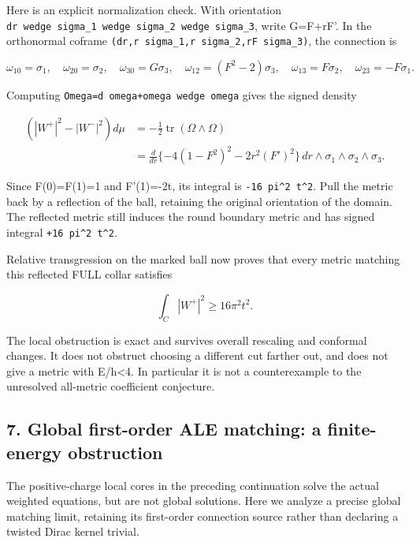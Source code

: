 \documentclass[
  10pt,
]{article}
\begin{document}
Here is an explicit normalization check. With orientation
\texttt{dr\ wedge\ sigma\_1\ wedge\ sigma\_2\ wedge\ sigma\_3}, write
G=F+rF'. In the orthonormal coframe
\texttt{(dr,r\ sigma\_1,r\ sigma\_2,rF\ sigma\_3)}, the connection is

\[
 \omega_{10}=\sigma_1,\quad\omega_{20}=\sigma_2,
 \quad\omega_{30}=G\sigma_3,\quad
 \omega_{12}=(F^2-2)\sigma_3,\quad
 \omega_{13}=F\sigma_2,\quad\omega_{23}=-F\sigma_1.
\]

Computing \texttt{Omega=d\ omega+omega\ wedge\ omega} gives the signed
density

\[
 \begin{aligned}
 (|W^+|^2-|W^-|^2)d\mu
 &= -\tfrac12\operatorname{tr}(\Omega\wedge\Omega)\\
 &=\frac{d}{dr}\{-4(1-F^2)^2-2r^2(F')^2\}
                       \,dr\wedge\sigma_1\wedge\sigma_2\wedge\sigma_3.
 \end{aligned}\tag{6.11}
\]

Since F(0)=F(1)=1 and F'(1)=-2t, its integral is
\texttt{-16\ pi\^{}2\ t\^{}2}. Pull the metric back by a reflection of
the ball, retaining the original orientation of the domain. The
reflected metric still induces the round boundary metric and has signed
integral \texttt{+16\ pi\^{}2\ t\^{}2}.

Relative transgression on the marked ball now proves that every metric
matching this reflected FULL collar satisfies

\[
                     \int_C|W^+|^2\ge16\pi^2t^2.    \tag{6.12}
\]

The local obstruction is exact and survives overall rescaling and
conformal changes. It does not obstruct choosing a different cut farther
out, and does not give a metric with E/h\textless4. In particular it is
not a counterexample to the unresolved all-metric coefficient
conjecture.

\hypertarget{global-first-order-ale-matching-a-finite-energy-obstruction}{%
\subsection{7. Global first-order ALE matching: a finite-energy
obstruction}\label{global-first-order-ale-matching-a-finite-energy-obstruction}}

The positive-charge local cores in the preceding continuation solve the
actual weighted equations, but are not global solutions. Here we analyze
a precise global matching limit, retaining its first-order connection
source rather than declaring a twisted Dirac kernel trivial.
\end{document}
